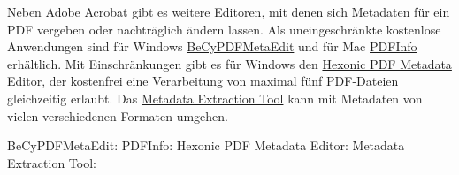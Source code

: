 Neben Adobe Acrobat gibt es weitere Editoren, mit denen sich Metadaten für ein PDF vergeben oder nachträglich ändern lassen. Als uneingeschränkte kostenlose Anwendungen sind für Windows \href{www.becyhome.de/becypdfmetaedit/description_ger.htm}{BeCyPDFMetaEdit} und für Mac \href{www.macupdate.com/app/mac/23356/pdfinfo}{PDFInfo} erhältlich. Mit Einschränkungen gibt es für Windows den \href{www.hexonic.de/index.php/hexonic-pdf-metadata-editor}{Hexonic PDF Metadata Editor}, der kostenfrei eine Verarbeitung von maximal fünf PDF-Dateien gleichzeitig erlaubt. Das \href{http://meta-extractor.sourceforge.net/}{Metadata Extraction Tool} kann mit Metadaten von vielen verschiedenen Formaten umgehen.

\begin{flushleft}
	BeCyPDFMetaEdit: 
	PDFInfo: 
	Hexonic PDF Metadata Editor: 
	Metadata Extraction Tool: 
\end{flushleft}


